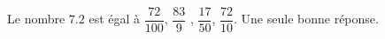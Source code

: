 
\begin{exercice}\label{exosmath-0792}

    Le nombre \( 7.2\) est égal à \( \dfrac{ 72 }{ 100 }\), $\dfrac{ 83 }{ 9 }$ , \( \dfrac{ 17 }{ 50 }\), \( \dfrac{ 72 }{ 10 }\). Une seule bonne réponse.

\end{exercice}
